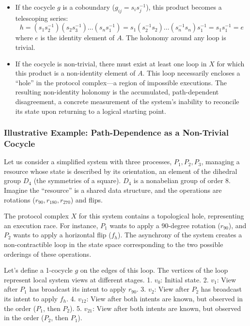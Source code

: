\documentclass[
]{article}
\providecommand{\tightlist}{%
  \setlength{\itemsep}{0pt}\setlength{\parskip}{0pt}}
\begin{document}
\begin{itemize}
\tightlist
\item
  If the cocycle \(g\) is a coboundary (\(g_{ij} = s_i s_j^{-1}\)), this
  product becomes a telescoping series:
  \[h = (s_1 s_2^{-1})(s_2 s_3^{-1})\dots(s_n s_1^{-1}) = s_1 (s_2^{-1} s_2) \dots (s_n^{-1} s_n) s_1^{-1} = s_1 s_1^{-1} = e\]
  where \(e\) is the identity element of \(A\). The holonomy around any
  loop is trivial.
\item
  If the cocycle is non-trivial, there must exist at least one loop in
  \(X\) for which this product is a non-identity element of \(A\). This
  loop necessarily encloses a ``hole'' in the protocol complex---a
  region of impossible executions. The resulting non-identity holonomy
  is the accumulated, path-dependent disagreement, a concrete
  measurement of the system's inability to reconcile its state upon
  returning to a logical starting point.
\end{itemize}

\subsubsection{Illustrative Example: Path-Dependence as a Non-Trivial
Cocycle}\label{illustrative-example-path-dependence-as-a-non-trivial-cocycle}

Let us consider a simplified system with three processes,
\(P_1, P_2, P_3\), managing a resource whose state is described by its
orientation, an element of the dihedral group \(D_4\) (the symmetries of
a square). \(D_4\) is a nonabelian group of order 8. Imagine the
``resource'' is a shared data structure, and the operations are
rotations (\(r_{90}, r_{180}, r_{270}\)) and flips.

The protocol complex \(X\) for this system contains a topological hole,
representing an execution race. For instance, \(P_1\) wants to apply a
90-degree rotation (\(r_{90}\)), and \(P_2\) wants to apply a horizontal
flip (\(f_h\)). The asynchrony of the system creates a non-contractible
loop in the state space corresponding to the two possible orderings of
these operations.

Let's define a 1-cocycle \(g\) on the edges of this loop. The vertices
of the loop represent local system views at different stages. 1.
\(v_0\): Initial state. 2. \(v_1\): View after \(P_1\) has broadcast its
intent to apply \(r_{90}\). 3. \(v_2\): View after \(P_2\) has broadcast
its intent to apply \(f_h\). 4. \(v_{12}\): View after both intents are
known, but observed in the order (\(P_1\), then \(P_2\)). 5. \(v_{21}\):
View after both intents are known, but observed in the order (\(P_2\),
then \(P_1\)).
\end{document}
